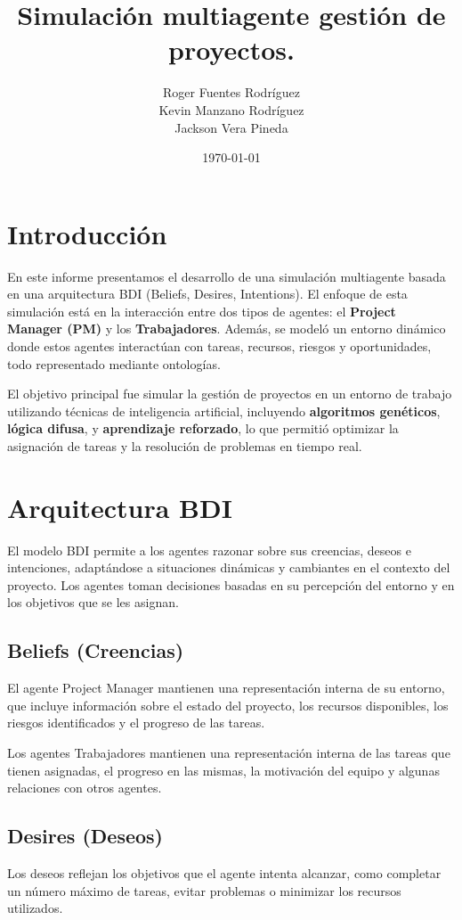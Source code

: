 \documentclass[a4paper, 12pt]{article}
\title{Simulación multiagente gestión de proyectos.}
\author{Roger Fuentes Rodr\'iguez \\ Kevin Manzano Rodr\'iguez \\ Jackson Vera Pineda}
\date{\today}
\begin{document}
\maketitle

\section{Introducción}
En este informe presentamos el desarrollo de una simulación multiagente basada en una arquitectura BDI (Beliefs, Desires, Intentions). El enfoque de esta simulación está en la interacción entre dos tipos de agentes: el \textbf{Project Manager (PM)} y los \textbf{Trabajadores}. Además, se modeló un entorno dinámico donde estos agentes interactúan con tareas, recursos, riesgos y oportunidades, todo representado mediante ontologías.

El objetivo principal fue simular la gestión de proyectos en un entorno de trabajo utilizando técnicas de inteligencia artificial, incluyendo \textbf{algoritmos genéticos}, \textbf{lógica difusa}, y \textbf{aprendizaje reforzado}, lo que permitió optimizar la asignación de tareas y la resolución de problemas en tiempo real.

\section{Arquitectura BDI}
El modelo BDI permite a los agentes razonar sobre sus creencias, deseos e intenciones, adaptándose a situaciones dinámicas y cambiantes en el contexto del proyecto. Los agentes toman decisiones basadas en su percepción del entorno y en los objetivos que se les asignan.

\subsection{Beliefs (Creencias)}
El agente Project Manager mantienen una representación interna de su entorno, que incluye información sobre el estado del proyecto, los recursos disponibles, los riesgos identificados y el progreso de las tareas.

Los agentes Trabajadores mantienen una representación interna de las tareas que tienen asignadas, el progreso en las mismas, la motivación del equipo y algunas relaciones con otros agentes.

\subsection{Desires (Deseos)}
Los deseos reflejan los objetivos que el agente intenta alcanzar, como completar un número máximo de tareas, evitar problemas o minimizar los recursos utilizados.
\end{document}
